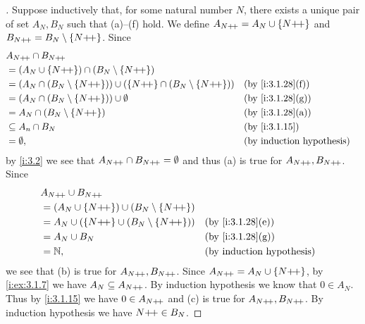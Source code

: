 \begin{proof}[]
  Suppose inductively that, for some natural number \(N\), there exists a unique pair of set \(A_N, B_N\) such that (a)--(f) hold.
  We define \(A_{N{+}\!{+}} = A_N \cup \left\lbrace N{+}\!{+}\right\rbrace\) and \(B_{N{+}\!{+}} = B_N \setminus \left\lbrace N{+}\!{+}\right\rbrace\).
  Since
  \begin{align*}
     & A_{N\pp} \cap B_{N\pp}                                                                                          \\
     & = (A_N \cup \set{N\pp}) \cap (B_N \setminus \set{N\pp})                                                         \\
     & = (A_N \cap (B_N \setminus \set{N\pp})) \cup (\set{N\pp} \cap (B_N \setminus \set{N\pp})) &  & \by{i:3.1.28}[f] \\
     & = (A_N \cap (B_N \setminus \set{N\pp})) \cup \emptyset                                    &  & \by{i:3.1.28}[g] \\
     & = A_N \cap (B_N \setminus \set{N\pp})                                                     &  & \by{i:3.1.28}[a] \\
     & \subseteq A_n \cap B_N                                                                    &  & \by{i:3.1.15}    \\
     & = \emptyset,                                                                              &  & \byIH
  \end{align*}
  by \cref{i:3.2} we see that \(A_{N{+}\!{+}} \cap B_{N{+}\!{+}} = \emptyset\) and thus (a) is true for \(A_{N{+}\!{+}}, B_{N{+}\!{+}}\).
  Since
  \begin{align*}
     & A_{N\pp} \cup B_{N\pp}                                                        \\
     & = (A_N \cup \set{N\pp}) \cup (B_N \setminus \set{N\pp})                       \\
     & = A_N \cup (\set{N\pp} \cup (B_N \setminus \set{N\pp})) &  & \by{i:3.1.28}[e] \\
     & = A_N \cup B_N                                          &  & \by{i:3.1.28}[g] \\
     & = \N,                                                   &  & \byIH
  \end{align*}
  we see that (b) is true for \(A_{N{+}\!{+}}, B_{N{+}\!{+}}\).
  Since \(A_{N{+}\!{+}} = A_N \cup \left\lbrace N{+}\!{+}\right\rbrace\), by \cref{i:ex:3.1.7} we have \(A_N \subseteq A_{N{+}\!{+}}\).
  By induction hypothesis we know that \(0 \in A_N\).
  Thus by \cref{i:3.1.15} we have \(0 \in A_{N{+}\!{+}}\) and (c) is true for \(A_{N{+}\!{+}}, B_{N{+}\!{+}}\).
  By induction hypothesis we have \(N{+}\!{+} \in B_N\).

\end{proof}
